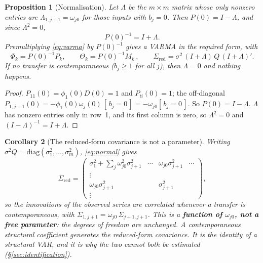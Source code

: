 \documentclass[11pt,a4paper]{article}
\theoremstyle{plain}
\newtheorem{proposition}{Proposition}
\newtheorem{corollary}[proposition]{Corollary}
\theoremstyle{remark}
\begin{document}
\begin{proposition}[Normalisation]
\label{prop:norm}
Let $\Lambda$ be the $m\times m$ matrix whose only nonzero entries are
$\Lambda_{1,j+1}=\omega_{j0}$ for those inputs with $b_j=0$. Then
$P(0)=I-\Lambda$, and since $\Lambda^2=0$,
\begin{equation}
P(0)^{-1} = I+\Lambda .
\label{eq:P0inv}
\end{equation}
Premultiplying \eqref{eq:varma} by $P(0)^{-1}$ gives a VARMA in the required form,
with
\begin{equation}
\Phi_k = P(0)^{-1}P_k,\qquad
\Theta_k = P(0)^{-1}M_k\,,\qquad
\Sigma_{\mathrm{red}} = \sigma^2\,(I+\Lambda)\,Q\,(I+\Lambda)' .
\label{eq:normal}
\end{equation}
If no transfer is contemporaneous ($b_j\ge 1$ for all $j$), then $\Lambda=0$ and
nothing happens.
\end{proposition}

\begin{proof}
$P_{11}(0)=\phi_1(0)D(0)=1$ and $P_{ii}(0)=1$; the off-diagonal
$P_{1,j+1}(0)=-\phi_1(0)\omega_j(0)\,[\,b_j=0\,]=-\omega_{j0}[\,b_j=0\,]$. So
$P(0)=I-\Lambda$. $\Lambda$ has nonzero entries only in row~1, and its first column
is zero, so $\Lambda^2=0$ and $(I-\Lambda)^{-1}=I+\Lambda$.
\end{proof}

\begin{corollary}[The reduced-form covariance is not a parameter]
\label{cor:sigma}
Writing $\sigma^2 Q=\mathrm{diag}(\sigma_1^2,\dots,\sigma_m^2)$,
\eqref{eq:normal} gives
\begin{equation}
\Sigma_{\mathrm{red}} =
\begin{pmatrix}
\sigma_1^2+\sum_j \omega_{j0}^2\sigma_{j+1}^2 & \cdots & \omega_{j0}\sigma_{j+1}^2 & \cdots\\
\vdots & & &\\
\omega_{j0}\sigma_{j+1}^2 & & \sigma_{j+1}^2 &\\
\vdots & & &
\end{pmatrix},
\end{equation}
so the innovations of the \emph{observed} series are correlated whenever a transfer
is contemporaneous, with $\Sigma_{1,j+1}=\omega_{j0}\,\Sigma_{j+1,j+1}$. This is a
\textbf{function of $\omega_{j0}$, not a free parameter}: the degrees of freedom are
unchanged. A contemporaneous structural coefficient \emph{generates} the reduced-form
covariance. It is the identity of a structural VAR, and it is why the two cannot both
be estimated (\S\ref{sec:identification}).
\end{corollary}
\end{document}
